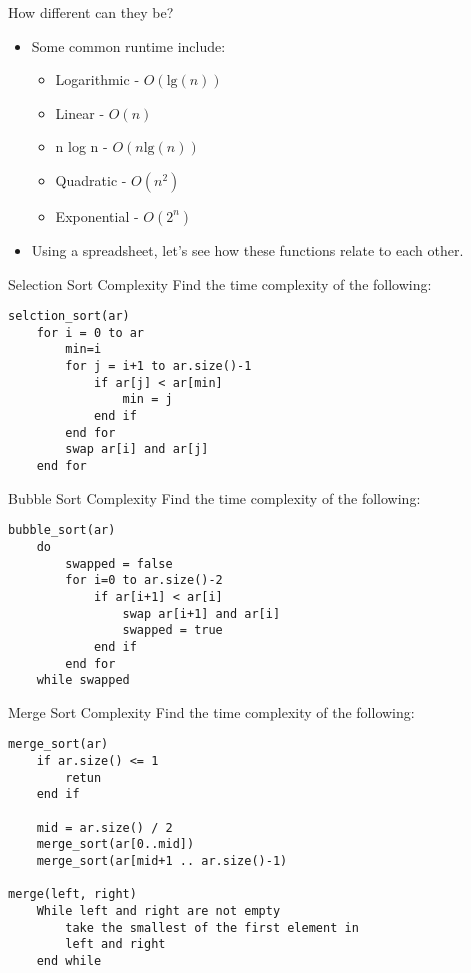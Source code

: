 \documentclass[]{beamer}
\begin{document}
\begin{frame}{How different can they be?}
    \begin{itemize}[<+->]
        \item Some common runtime include:
        \begin{itemize}
            \item Logarithmic  - $O(\mathrm{lg}(n))$
            \item Linear - $O(n)$
            \item n log n - $O(n \mathrm{lg}(n))$
            \item Quadratic - $O(n^2)$
            \item Exponential - $O(2^n)$
        \end{itemize}
        \item Using a spreadsheet, let's see how these functions relate
            to each other.
    \end{itemize}
\end{frame}

\begin{frame}[fragile]{Selection Sort Complexity}
Find the time complexity of the following:
\begin{verbatim}
selction_sort(ar)
    for i = 0 to ar
        min=i
        for j = i+1 to ar.size()-1
            if ar[j] < ar[min] 
                min = j
            end if
        end for
        swap ar[i] and ar[j]
    end for
\end{verbatim}
\end{frame}

\begin{frame}[fragile]{Bubble Sort Complexity}
Find the time complexity of the following:
\begin{verbatim}
bubble_sort(ar)
    do
        swapped = false
        for i=0 to ar.size()-2
            if ar[i+1] < ar[i]
                swap ar[i+1] and ar[i]
                swapped = true
            end if
        end for
    while swapped
\end{verbatim}
\end{frame}

\begin{frame}[fragile]{Merge Sort Complexity}
Find the time complexity of the following:
\begin{verbatim}
merge_sort(ar)
    if ar.size() <= 1 
        retun
    end if

    mid = ar.size() / 2
    merge_sort(ar[0..mid])
    merge_sort(ar[mid+1 .. ar.size()-1) 

merge(left, right)
    While left and right are not empty
        take the smallest of the first element in
        left and right
    end while
\end{verbatim}
\end{frame}
\end{document}
